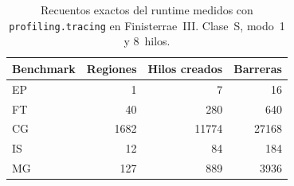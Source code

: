 \begin{table}[htbp]
\centering
\small
\begin{tabular}{lrrr}
\hline
Benchmark & Regiones & Hilos creados & Barreras \\
\hline
EP & 1 & 7 & 16 \\
FT & 40 & 280 & 640 \\
CG & 1682 & 11774 & 27168 \\
IS & 12 & 84 & 184 \\
MG & 127 & 889 & 3936 \\
\hline
\end{tabular}
\caption{Recuentos exactos del runtime medidos con \texttt{profiling.tracing}
en Finisterrae~III. Clase~S, modo~1 y 8~hilos.}
\label{tab:profiling-py315-trace}
\end{table}
